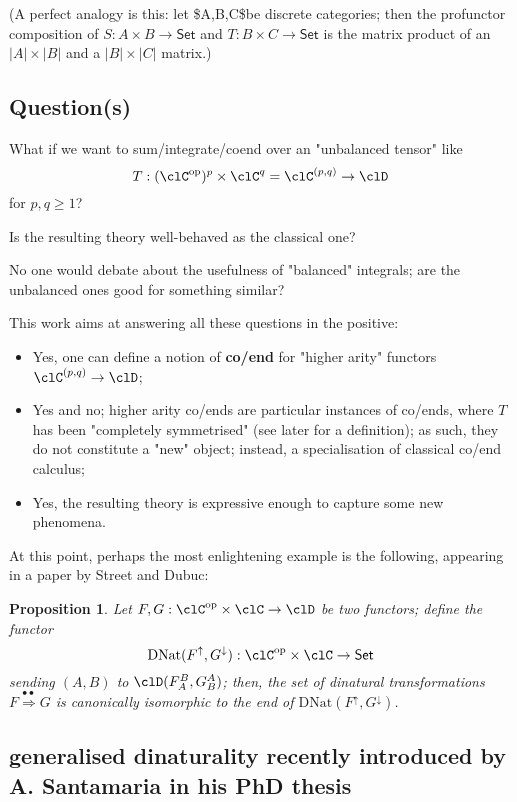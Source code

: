 \documentclass[11pt]{amsart}
\def\din{\overset{\bullet\bullet}\Longrightarrow}
\newtheorem{proposition}{Proposition}
\begin{document}
(A perfect analogy is this: let \$A,B,C\$be discrete categories; then the profunctor composition of \(S : A\times B \to \textsf{Set}\) and \(T : B \times C \to \textsf{Set}\) is the matrix product of an \(|A|\times |B|\) and a \(|B|\times |C|\) matrix.)

\subsection{Question(s)}
\label{sec:org1c57692}

What if we want to sum/integrate/coend over an "unbalanced tensor" like 
\[
T : (\clC^\text{op})^p \times \clC^q = \clC^{(p,q)} \to \clD
\] for \(p,q\ge 1\)?

Is the resulting theory well-behaved as the classical one?

No one would debate about the usefulness of "balanced" integrals; are the unbalanced ones good for something similar?

This work aims at answering all these questions in the positive:

\begin{itemize}
\item Yes, one can define a notion of \textbf{co/end} for "higher arity" functors \(\clC^{(p,q)} \to \clD\);
\item Yes and no; higher arity co/ends are particular instances of co/ends, where \(T\) has been "completely symmetrised" (see later for a definition); as such, they do not constitute a "new" object; instead, a specialisation of classical co/end calculus;
\item Yes, the resulting theory is expressive enough to capture some new phenomena.
\end{itemize}

At this point, perhaps the most enlightening example is the following, appearing in a paper by Street and Dubuc: 

\begin{proposition}
Let $F,G : \clC^\text{op} \times \clC \to \clD$ be two functors; define the functor 
\[
\mathrm{DNat}(F^\uparrow,G^\downarrow) : \clC^\text{op} \times \clC \to \textsf{Set}
\] sending $(A,B)$ to $\clD(F_A^B, G^A_B)$; then, the set of dinatural transformations $F \din G$ is canonically isomorphic to the end of $\text{DNat}(F^\uparrow,G^\downarrow)$.
\end{proposition}

\subsection{generalised dinaturality recently introduced by A. Santamaria in his PhD thesis}
\label{sec:orgc27d079}
\end{document}
